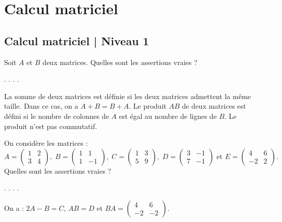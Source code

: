 

\section{Calcul matriciel}
\subsection{Calcul matriciel | Niveau 1}

\begin{question}
Soit $A$ et $B$ deux matrices. Quelles sont les assertions vraies ?
\begin{answers}  
.
. 
.
.
\end{answers}
\begin{explanations} La somme de deux matrices est définie si les deux matrices admettent la même taille. Dans ce cas, on a $A+B=B+A$. Le produit $AB$ de deux matrices est défini si le nombre de colonnes de $A$ est égal au nombre de lignes de $B$. Le produit n'est pas commutatif.
\end{explanations}
\end{question}


\begin{question}
On considère les matrices : 
$$A=  
\left(\begin{array}{rc}
1&2\\
3&4\end{array}\right),\; B=  
\left(\begin{array}{rc}
1&1\\
1&-1\end{array}\right),\; C=  
\left(\begin{array}{rc}
1&3\\
5&9\end{array}\right),\; D=  
\left(\begin{array}{rc}
3&-1\\
7&-1\end{array}\right)\mbox{ et }E=  
\left(\begin{array}{rc}
4&6\\
-2&2\end{array}\right).$$ 
Quelles sont les assertions vraies ?
\begin{answers}  
.
.
.
.
\end{answers}
\begin{explanations}  On a : $2A-B=C$, $AB=D$ et $BA =  \left(\begin{array}{rc}4&6\\-2&-2 \end{array}\right)$.
\end{explanations}
\end{question}

